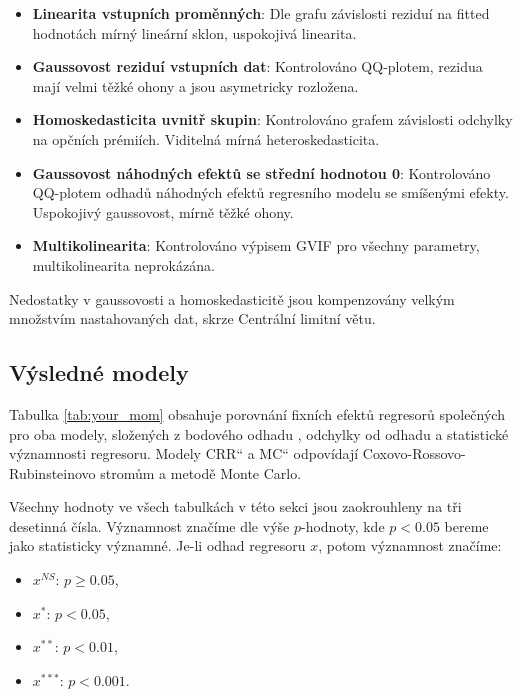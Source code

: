 \documentclass[male,czech,api_bc]{kitheses}
\newcommand{\UV}[1]{\quotedblbase#1\textquotedblleft}
\begin{document}
  \begin{itemize}
    \item{\textbf{Linearita vstupních proměnných}: Dle grafu závislosti reziduí na fitted hodnotách mírný lineární sklon, uspokojivá linearita.}
    \item{\textbf{Gaussovost reziduí vstupních dat}: Kontrolováno QQ-plotem, rezidua mají velmi těžké ohony a jsou asymetricky rozložena.}
    \item{\textbf{Homoskedasticita uvnitř skupin}: Kontrolováno grafem závislosti odchylky na opčních prémiích. Viditelná mírná heteroskedasticita.}
    \item{\textbf{Gaussovost náhodných efektů se střední hodnotou 0}: Kontrolováno QQ-plotem odhadů náhodných efektů regresního modelu se smíšenými efekty. Uspokojivý gaussovost, mírně těžké ohony.}
    \item{\textbf{Multikolinearita}: Kontrolováno výpisem GVIF pro všechny parametry, multikolinearita neprokázána.}
  \end{itemize}

  Nedostatky v gaussovosti a homoskedasticitě jsou kompenzovány velkým množstvím nastahovaných dat, skrze Centrální limitní větu.

  \subsection{Výsledné modely}

  Tabulka \ref{tab:your_mom} obsahuje porovnání fixních efektů regresorů společných pro oba modely, složených z bodového odhadu , odchylky od odhadu a statistické významnosti regresoru. Modely \UV{CRR} a \UV{MC} odpovídají Coxovo-Rossovo-Rubinsteinovo stromům a metodě Monte Carlo.

  Všechny hodnoty ve všech tabulkách v této sekci jsou zaokrouhleny na tři desetinná čísla. Významnost značíme dle výše $p$-hodnoty, kde $p < 0.05$ bereme jako statisticky významné. Je-li odhad regresoru $x$, potom významnost značíme:
  \begin{itemize}
    \item $x^{NS}$: $p \ge 0.05$,
    \item $x^{*}$: $p < 0.05$,
    \item $x^{**}$: $p < 0.01$,
    \item $x^{***}$: $p < 0.001$.
  \end{itemize}
\end{document}

